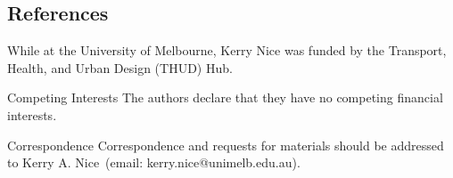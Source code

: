 \documentclass{nature}
\begin{document}

\subsection{References}\label{ref}









\begin{addendum}
 \item While at the University of Melbourne, Kerry Nice was funded by the Transport, Health, and Urban Design (THUD) Hub.
 \item[Competing Interests] The authors declare that they have no
competing financial interests.
 \item[Correspondence] Correspondence and requests for materials
should be addressed to Kerry A. Nice~(email: kerry.nice@unimelb.edu.au).
\end{addendum}


\end{document}
